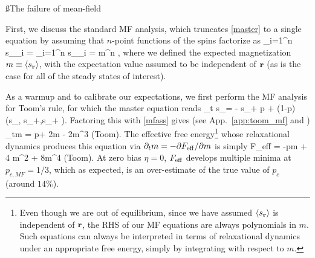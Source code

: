 \documentclass[pra,aps,twocolumn,groupedaddress,superscriptaddress,nofootinbib,preprintnumbers]{revtex4-2}
\begin{document}
	
	\ss{The failure of mean-field}
	
	
	First, we discuss the standard MF analysis, which truncates \eqref{master} to a single equation by assuming that $n$-point functions of the spins factorize as 
	\be \label{mfass} \left\lan \prod_{i=1}^n s_{\bfr_i} \right\ran = \prod_{i=1}^n \lan s_{\bfr_i} \ran = m^n ,\ee 
	where we defined the expected magnetization $m \equiv \langle s_{\mathbf{r}}\rangle$, with the expectation value assumed to be independent of $\mathbf{r}$ (as is the case for all of the steady states of interest). 
	
	As a warmup and to calibrate our expectations, we first perform the MF analysis for Toom's rule, for which the master equation reads 
	\be \p_t \lan s_\bfr \ran = - \lan s_\bfr\ran + \eta p + (1-p) \lan \maj(s_\bfr, s_{\bfr+\uvx},s_{\bfr+\uvy} )\ran.\ee 
	Factoring this with \eqref{mfass} gives (see App.~\ref{app:toom_mf} and \cite{lebowitz1990statistical})
	\be \p_tm = p\eta + 2m - 2m^3 \quad ({\sf Toom}).\ee 
	The effective free energy\footnote{Even though we are out of equilibrium, since we have assumed $\langle s_{\mathbf{r}}\rangle$ is independent of $\mathbf{r}$, the RHS of our MF equations are always polynomials in $m$. Such equations can always be interpreted in terms of relaxational dynamics under an appropriate free energy, simply by integrating with respect to $m$. } whose relaxational dynamics produces this equation via $\partial_t m = -\partial F_{\rm eff} / \partial m$ is simply 
	\be F_{\rm eff} = -p\eta m + 4 m^2 + 8m^4 \quad ({\sf Toom}).\ee 
	At zero bias $\eta=0$, $F_{\rm eff}$ develops multiple minima at $p_{c,MF} = 1/3$, which as expected, is an over-estimate of the true value of $p_c$ (around $14\%$). 
	
\end{document}
